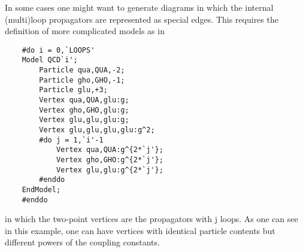 In some cases one might want to generate diagrams in which the internal 
(multi)loop propagators are represented as special edges. This requires the 
definition of more complicated models as in
\begin{verbatim}
    #do i = 0,`LOOPS'
    Model QCD`i';
        Particle qua,QUA,-2;
        Particle gho,GHO,-1;
        Particle glu,+3;
        Vertex qua,QUA,glu:g;
        Vertex gho,GHO,glu:g;
        Vertex glu,glu,glu:g;
        Vertex glu,glu,glu,glu:g^2;
        #do j = 1,`i'-1
            Vertex qua,QUA:g^{2*`j'};
            Vertex gho,GHO:g^{2*`j'};
            Vertex glu,glu:g^{2*`j'};
        #enddo
    EndModel;
    #enddo
\end{verbatim}
in which the two-point vertices are the propagators with j loops. As one 
can see in this example, one can have vertices with identical particle 
contents but different powers of the coupling constants.

